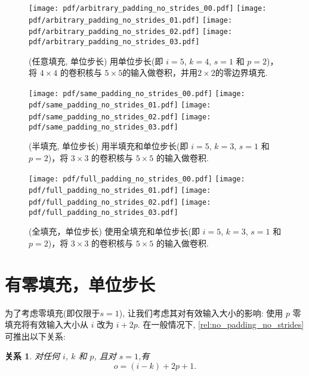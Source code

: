 \documentclass[notitlepage]{ctexrep}
\newtheorem{relationship}{关系}
\begin{document}
\begin{figure}[p]
    \centering
    \texttt{[image: pdf/arbitrary\_padding\_no\_strides\_00.pdf]}
    \texttt{[image: pdf/arbitrary\_padding\_no\_strides\_01.pdf]}
    \texttt{[image: pdf/arbitrary\_padding\_no\_strides\_02.pdf]}
    \texttt{[image: pdf/arbitrary\_padding\_no\_strides\_03.pdf]}
    \caption{\label{fig:arbitrary_padding_no_strides} (任意填充, 单位步长) 用单位步长(即 $i = 5$, $k = 4$, $s = 1$ 和 $p = 2$)，将 $4 \times 4$ 的卷积核与 $5 \times 5$的输入做卷积，并用$2 \times 2$的零边界填充.}
\end{figure}

\begin{figure}[p]
    \centering
    \texttt{[image: pdf/same\_padding\_no\_strides\_00.pdf]}
    \texttt{[image: pdf/same\_padding\_no\_strides\_01.pdf]}
    \texttt{[image: pdf/same\_padding\_no\_strides\_02.pdf]}
    \texttt{[image: pdf/same\_padding\_no\_strides\_03.pdf]}
    \caption{\label{fig:same_padding_no_strides} (半填充, 单位步长)
    用半填充和单位步长(即 $i = 5$, $k = 3$, $s = 1$ 和 $p = 2$)，将 $3 \times 3$ 的卷积核与 $5 \times 5$ 的输入做卷积.}
\end{figure}

\begin{figure}[p]
    \centering
    \texttt{[image: pdf/full\_padding\_no\_strides\_00.pdf]}
    \texttt{[image: pdf/full\_padding\_no\_strides\_01.pdf]}
    \texttt{[image: pdf/full\_padding\_no\_strides\_02.pdf]}
    \texttt{[image: pdf/full\_padding\_no\_strides\_03.pdf]}
    \caption{\label{fig:full_padding_no_strides} (全填充，单位步长)
    使用全填充和单位步长(即 $i = 5$, $k = 3$, $s = 1$ 和 $p = 2$)，将 $3 \times 3$ 的卷积核与 $5 \times 5$ 的输入做卷积.}
\end{figure}

\section{有零填充，单位步长}

为了考虑零填充(即仅限于$s = 1$), 让我们考虑其对有效输入大小的影响: 使用 $p$ 零填充将有效输入大小从 $i$ 改为 $i + 2p$. 在一般情况下,
\autoref{rel:no_padding_no_strides} 可推出以下关系:

\begin{relationship}\label{rel:arbitrary_padding_no_strides}
对任何 $i$, $k$ 和 $p$, 且对 $s = 1$,有
\begin{equation*}
    o = (i - k) + 2p + 1.
\end{equation*}
\end{relationship}
\end{document}
